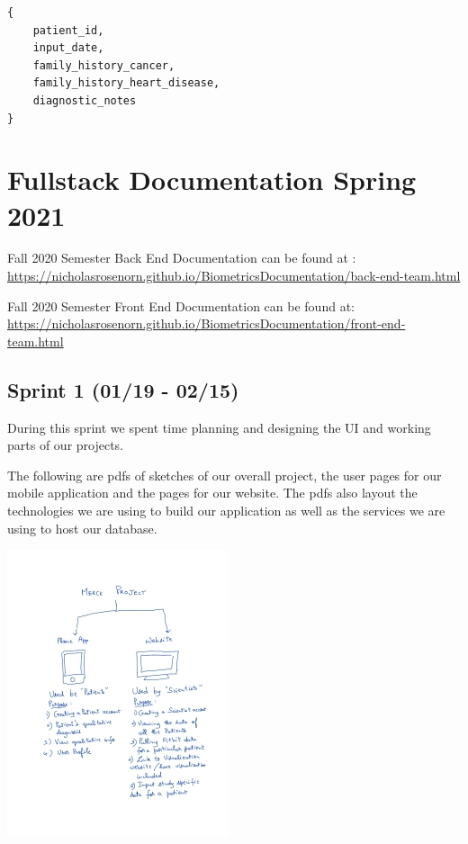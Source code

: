 \documentclass[]{book}
\begin{document}
\begin{verbatim}
{
    patient_id,
    input_date,
    family_history_cancer,
    family_history_heart_disease,
    diagnostic_notes
}
\end{verbatim}

\hypertarget{fullstack-documentation-spring-2021}{%
\chapter{Fullstack Documentation Spring 2021}\label{fullstack-documentation-spring-2021}}

Fall 2020 Semester Back End Documentation can be found at : \url{https://nicholasrosenorn.github.io/BiometricsDocumentation/back-end-team.html}

Fall 2020 Semester Front End Documentation can be found at: \url{https://nicholasrosenorn.github.io/BiometricsDocumentation/front-end-team.html}

\hypertarget{sprint-1-0119---0215}{%
\section{Sprint 1 (01/19 - 02/15)}\label{sprint-1-0119---0215}}

During this sprint we spent time planning and designing the UI and working parts of our projects.

The following are pdfs of sketches of our overall project, the user pages for our mobile application and the pages for our website. The pdfs also layout the technologies we are using to build our application as well as the services we are using to host our database.

\includegraphics{images/project_overview.png}
\end{document}
